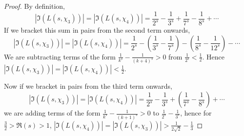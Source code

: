 \documentclass{unswmaths}
\begin{document}
    \begin{proof}
        By definition,
        \begin{equation*}
            |\Im(L(s,\chi_3))| = |\Im(L(s,\chi_4))| = \frac{1}{2^s}-\frac{1}{3^s}+\frac{1}{7^s}-\frac{1}{8^s}+\cdots
        \end{equation*}
        If we bracket this sum in pairs from the second term onwards,
        \begin{equation*}
            |\Im(L(s,\chi_3))| = |\Im(L(s,\chi_4))| = \frac{1}{2^s}-\left(\frac{1}{3^s}-\frac{1}{7^s}\right)-\left(\frac{1}{8^s}-\frac{1}{12^s}\right)-\cdots
        \end{equation*}
        We are subtracting terms of the form $\frac{1}{k^s}-\frac{1}{(k+4)^s} > 0$ from $\frac{1}{2^s} < \frac{1}{2}$. Hence $|\Im(L(s,\chi_3))| = |\Im(L(s,\chi_4))| < \frac{1}{2}$.
        
        Now if we bracket in pairs from the third term onwards,
        \begin{equation*}
            |\Im(L(s,\chi_3))| = |\Im(L(s,\chi_4))| = \frac{1}{2^s}-\frac{1}{3^s}+\left(\frac{1}{7^s}-\frac{1}{8^s}\right)+\cdots
        \end{equation*}
        we are adding terms of the form $\frac{1}{k^s}-\frac{1}{(k+1)^s} > 0$ to $\frac{1}{2^s}-\frac{1}{3^s}$, hence for $\frac{3}{2} > \Re(s) > 1$, $|\Im(L(s,\chi_4))| = |\Im(L(s,\chi_3))| > \frac{1}{2\sqrt{2}}-\frac{1}{3}$
    \end{proof} 
    
\end{document}
